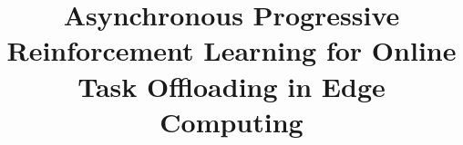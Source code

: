 \documentclass[10pt, conference, letterpaper]{IEEEtran}
\begin{document}
\title{Asynchronous Progressive Reinforcement Learning for Online Task Offloading in Edge Computing}
\author{}
\maketitle

\begin{abstract}



\end{abstract}
\end{document}
